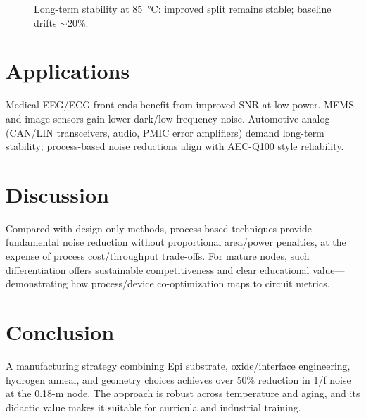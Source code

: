 \documentclass[conference]{IEEEtran}
\begin{document}
\begin{figure}[t]
\centering
{}
\caption{Long-term stability at \SI{85}{\celsius}: improved split remains stable; baseline drifts $\sim$20\%.}
\label{fig:aging}
\end{figure}

\section{Applications}
Medical EEG/ECG front-ends benefit from improved SNR at low power. MEMS and image sensors gain lower dark/low-frequency noise. Automotive analog (CAN/LIN transceivers, audio, PMIC error amplifiers) demand long-term stability; process-based noise reductions align with AEC-Q100 style reliability.

\section{Discussion}
Compared with design-only methods, process-based techniques provide fundamental noise reduction without proportional area/power penalties, at the expense of process cost/throughput trade-offs. For mature nodes, such differentiation offers sustainable competitiveness and clear educational value---demonstrating how process/device co-optimization maps to circuit metrics.

\section{Conclusion}
A manufacturing strategy combining Epi substrate, oxide/interface engineering, hydrogen anneal, and geometry choices achieves over 50\% reduction in 1/f noise at the 0.18-\textmu m node. The approach is robust across temperature and aging, and its didactic value makes it suitable for curricula and industrial training.
\end{document}
